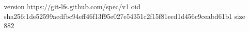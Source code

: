 version https://git-lfs.github.com/spec/v1
oid sha256:1de52599aedfbc94eff46f13f95e027e54351c2f15f81eed1d456c9ceabd61b1
size 882
